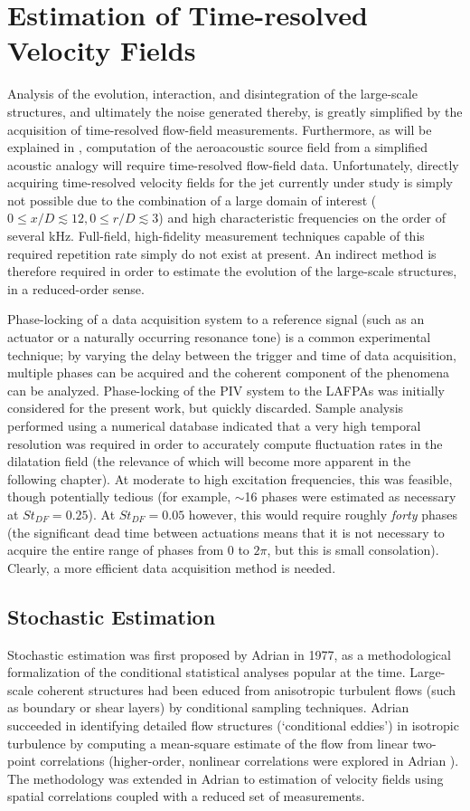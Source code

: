 \chapter{Estimation of Time-resolved Velocity Fields}
\label{sect:velocity}
Analysis of the evolution, interaction, and disintegration of the large-scale structures, and ultimately the noise generated thereby, is greatly simplified by the acquisition of time-resolved flow-field measurements.
Furthermore, as will be explained in , computation of the aeroacoustic source field from a simplified acoustic analogy will require time-resolved flow-field data.
Unfortunately, directly acquiring time-resolved velocity fields for the jet currently under study is simply not possible due to the combination of a large domain of interest ($0 \leq x/D \lesssim 12, 0 \leq r/D \lesssim 3$) and high characteristic frequencies on the order of several kHz.
Full-field, high-fidelity measurement techniques capable of this required repetition rate simply do not exist at present.
An indirect method is therefore required in order to estimate the evolution of the large-scale structures, in a reduced-order sense.

Phase-locking of a data acquisition system to a reference signal (such as an actuator or a naturally occurring resonance tone) is a common experimental technique; by varying the delay between the trigger and time of data acquisition, multiple phases can be acquired and the coherent component of the phenomena can be analyzed.
Phase-locking of the PIV system to the LAFPAs was initially considered for the present work, but quickly discarded.
Sample analysis performed using a numerical database indicated that a very high temporal resolution was required in order to accurately compute fluctuation rates in the dilatation field (the relevance of which will become more apparent in the following chapter).
At moderate to high excitation frequencies, this was feasible, though potentially tedious (for example, $\sim$16 phases were estimated as necessary at $St_{DF} =0.25$).
At $St_{DF} =0.05$ however, this would require roughly \textit{forty} phases (the significant dead time between actuations means that it is not necessary to acquire the entire range of phases from $0$ to $2\pi$, but this is small consolation).
Clearly, a more efficient data acquisition method is needed.
\section{Stochastic Estimation}
Stochastic estimation was first proposed by Adrian \citep{Adrian1977} in 1977, as a methodological formalization of the conditional statistical analyses popular at the time. 
Large-scale coherent structures had been educed from anisotropic turbulent flows (such as boundary or shear layers) by conditional sampling techniques.
Adrian succeeded in identifying detailed flow structures (`conditional eddies') in isotropic turbulence by computing a mean-square estimate of the flow from linear two-point correlations (higher-order, nonlinear correlations were explored in Adrian \citep{Adrian1979}). 
The methodology was extended in Adrian \citep{Adrian1994} to estimation of velocity fields using spatial correlations coupled with a reduced set of measurements.

